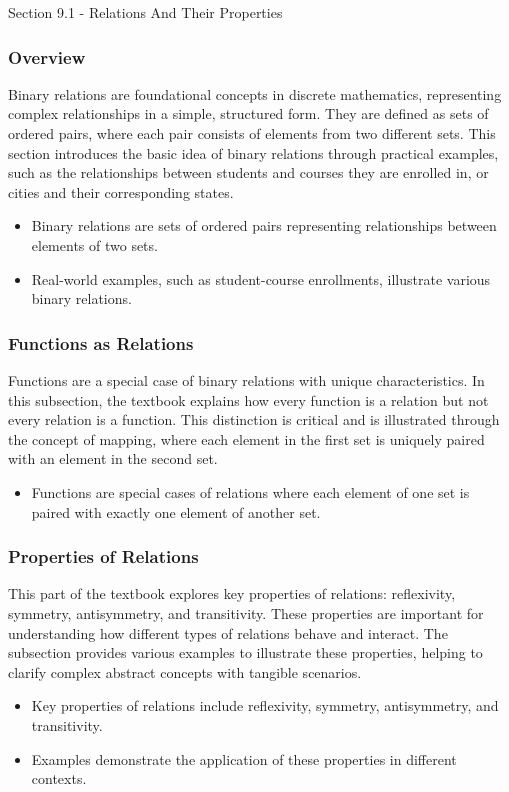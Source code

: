 \begin{notes}{Section 9.1 - Relations And Their Properties}
    \subsubsection*{Overview}
    Binary relations are foundational concepts in discrete mathematics, representing complex relationships in a simple, structured form. They are defined as sets of ordered pairs, where each pair consists 
    of elements from two different sets. This section introduces the basic idea of binary relations through practical examples, such as the relationships between students and courses they are enrolled in, 
    or cities and their corresponding states.
    \begin{itemize}
        \item Binary relations are sets of ordered pairs representing relationships between elements of two sets.
        \item Real-world examples, such as student-course enrollments, illustrate various binary relations.
    \end{itemize}
    
    \subsubsection*{Functions as Relations}
    Functions are a special case of binary relations with unique characteristics. In this subsection, the textbook explains how every function is a relation but not every relation is a function. This 
    distinction is critical and is illustrated through the concept of mapping, where each element in the first set is uniquely paired with an element in the second set.
    \begin{itemize}
        \item Functions are special cases of relations where each element of one set is paired with exactly one element of another set.
    \end{itemize}
    
    \subsubsection*{Properties of Relations}
    This part of the textbook explores key properties of relations: reflexivity, symmetry, antisymmetry, and transitivity. These properties are important for understanding how different types of relations 
    behave and interact. The subsection provides various examples to illustrate these properties, helping to clarify complex abstract concepts with tangible scenarios.
    \begin{itemize}
        \item Key properties of relations include reflexivity, symmetry, antisymmetry, and transitivity.
        \item Examples demonstrate the application of these properties in different contexts.
    \end{itemize}
    

\end{notes}
